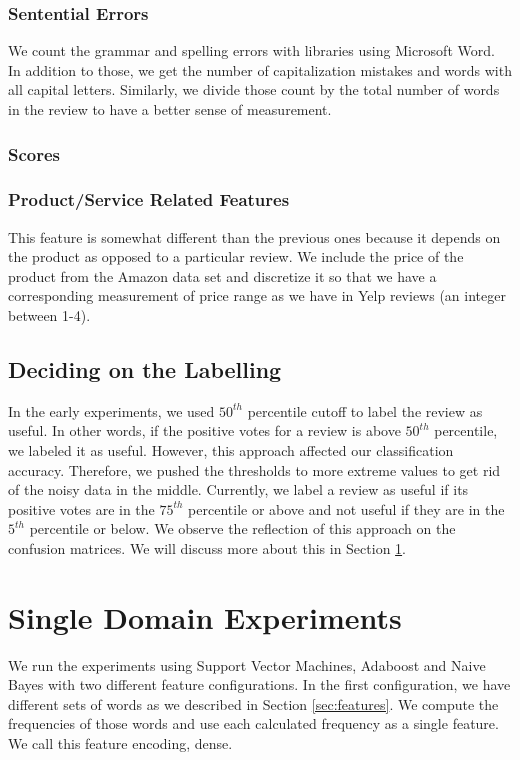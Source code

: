 \documentclass[letterpaper]{article}
\begin{document}
\subsubsection{Sentential Errors}
We count the grammar and spelling errors with libraries using
Microsoft Word. In addition to those, we get the number of
capitalization mistakes and words with all capital letters. Similarly, we
divide those count by the total number of words in the review to have
a better sense of measurement.  

\subsubsection{Scores}

\subsubsection{Product/Service Related Features} 
This feature is somewhat different than the previous ones
because it depends on the product as opposed to a particular
review. We include the price of the product from the Amazon data set and
discretize it so that we have a corresponding measurement of price
range as we have in Yelp reviews (an integer between 1-4). 

\subsection{Deciding on the Labelling}
In the early experiments, we used $50^{th}$ percentile cutoff to label the
review as useful. In other words, if the positive votes for a review is above
$50^{th}$ percentile, we labeled it as useful. However, this approach affected our classification
accuracy. Therefore, we pushed the thresholds to more extreme values
to get rid of the noisy data in the middle. Currently, we label a review as useful
if its positive votes are in the $75^{th}$ percentile or above and not
useful if they are 
in the $5^{th}$ percentile or below. We observe the reflection of this
approach on the confusion matrices. We will discuss more about this in
Section \ref{sec:single_domain}.


\section{Single Domain Experiments}
\label{sec:single_domain}  
We run the experiments using Support Vector Machines, Adaboost and
Naive Bayes with two different feature configurations. In the first
configuration, we have different sets of words as we described in
Section \ref{sec:features}. We compute the frequencies of those
words and use each calculated frequency as a single feature. We call
this feature encoding, dense. 
\end{document}
